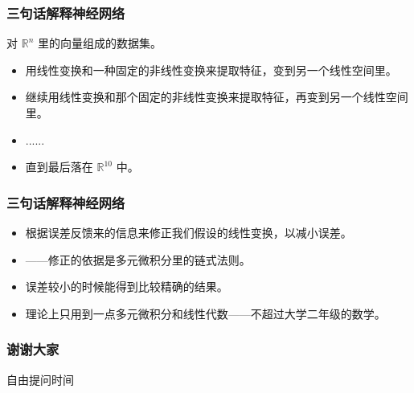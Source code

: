 \documentclass[CJK]{beamer}
\begin{document}
\begin{frame}
\frametitle{三句话解释神经网络}

对 $\mathbb{R}^{n}$ 里的向量组成的数据集。
\begin{itemize}
	\item 用线性变换和一种固定的非线性变换来提取特征，变到另一个线性空间里。
	\item 继续用线性变换和那个固定的非线性变换来提取特征，再变到另一个线性空间里。
	\item ......
	\item 直到最后落在 $\mathbb R^{10}$ 中。

\end{itemize}
\end{frame}

\begin{frame}
\frametitle{三句话解释神经网络}

\begin{itemize}
	\item 根据误差反馈来的信息来修正我们假设的线性变换，以减小误差。
	\item ——修正的依据是多元微积分里的链式法则。
	\vspace{12px}
	\item 误差较小的时候能得到比较精确的结果。
	\item \alert{理论上}只用到一点多元微积分和线性代数——不超过大学二年级的数学。

\end{itemize}
\end{frame}

\begin{frame}
\frametitle{谢谢大家}
自由提问时间
\end{frame}
\end{document}
